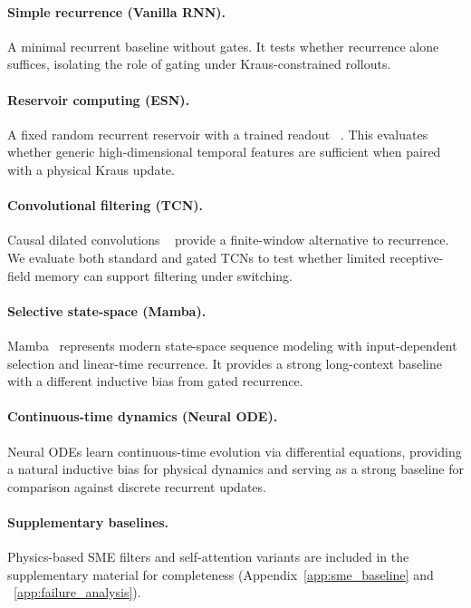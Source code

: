 \documentclass{article} %
\begin{document}
\paragraph{Simple recurrence (Vanilla RNN).}
A minimal recurrent baseline without gates. It tests whether recurrence alone suffices, isolating the role of gating under Kraus-constrained rollouts.

\paragraph{Reservoir computing (ESN).}
A fixed random recurrent reservoir with a trained readout ~\citep{jaeger2001esn}. This evaluates whether generic high-dimensional temporal features are sufficient when paired with a physical Kraus update.

\paragraph{Convolutional filtering (TCN).}
Causal dilated convolutions ~\citep{bai2018tcn} provide a finite-window alternative to recurrence. We evaluate both standard and gated TCNs to test whether limited receptive-field memory can support filtering under switching.

\paragraph{Selective state-space (Mamba).}
Mamba ~\citep{gu2024mamba}represents modern state-space sequence modeling with input-dependent selection and linear-time recurrence. It provides a strong long-context baseline with a different inductive bias from gated recurrence\cite{gu2024mamba}.
\paragraph{Continuous-time dynamics (Neural ODE).} Neural ODEs learn continuous-time evolution via differential equations, providing a natural inductive bias for physical dynamics and serving as a strong baseline for comparison against discrete recurrent updates\cite{chen2018neuralode}.
\paragraph{Supplementary baselines.}
Physics-based SME filters and self-attention variants \citep{vaswani2017attention}are included in the supplementary material for completeness  (Appendix~\ref{app:sme_baseline} and ~\ref{app:failure_analysis}).
\end{document}
